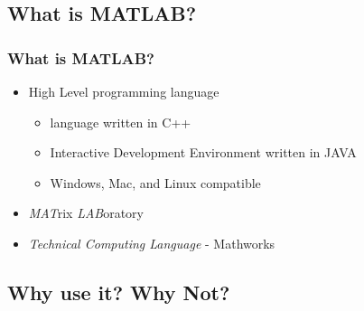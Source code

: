 \documentclass[fleqn]{ltx-talk} %
\newcommand{\sectionIIsubsectionItitle}{What is MATLAB?}
\newcommand{\sectionIIsubsectionIItitle}{Why use it? Why Not?}
\begin{document}
		\subsection{\sectionIIsubsectionItitle}\label{sectionIIsubsectionI}

			\begin{frame}
				\frametitle{\sectionIIsubsectionItitle}

				\begin{itemize}
					\item High Level programming language
					\begin{itemize}
						\item language written in C++
						\item Interactive Development Environment written in JAVA 
						\item Windows, Mac, and Linux compatible
					\end{itemize}
					\item {\itshape MAT}rix {\itshape LAB}oratory
					\item {\itshape Technical Computing Language} - Mathworks
				\end{itemize}	

				\btVFill
			\end{frame}

		\subsection{\sectionIIsubsectionIItitle}\label{sectionIIsubsectionII}
\end{document}
